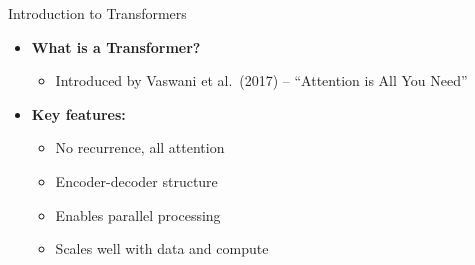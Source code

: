 \begin{frame}{Introduction to Transformers}
  \begin{itemize}
    \item[$\blacktriangleright$] \textbf{What is a Transformer?}
    \begin{itemize}
      \item Introduced by Vaswani et al.\ (2017) -- ``Attention is All You Need''
    \end{itemize}
    \vspace{0.6em}
    \item[$\blacktriangleright$] \textbf{Key features:}
    \begin{itemize}
      \item No recurrence, all attention
      \item Encoder-decoder structure
      \item Enables parallel processing
      \item Scales well with data and compute
    \end{itemize}
  \end{itemize}
\end{frame}

